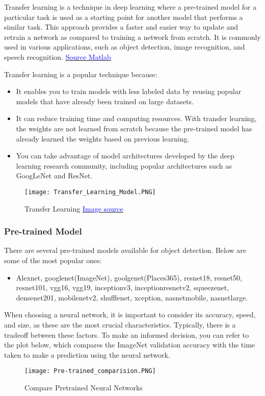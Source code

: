 Transfer learning is a technique in deep learning where a pre-trained model for a particular task is used as a starting point for another model that performs a similar task. This approach provides a faster and easier way to update and retrain a network as compared to training a network from scratch. It is commonly used in various applications, such as object detection, image recognition, and speech recognition. \cite{you2021logme}
\href{https://www.mathworks.com/discovery/transfer-learning.html?s_tid=srchtitle_support_results_1_Transfer%2520Learning}{\textcolor{blue}{Source Matlab}}

Transfer learning is a popular technique because:
\begin{itemize}
    \item It enables you to train models with less labeled data by reusing popular models that have already been trained on large datasets.
    \item  It can reduce training time and computing resources. With transfer learning, the weights are not learned from scratch because the pre-trained model has already learned the weights based on previous learning.
    \item You can take advantage of model architectures developed by the deep learning research community, including popular architectures such as GoogLeNet and ResNet.
\end{itemize}
\begin{figure}[H]
    \centering\texttt{[image: Transfer\_Learning\_Model.PNG]}
    \caption{Transfer Learning \protect\href{https://www.mathworks.com/help/deeplearning/ug/pretrained-convolutional-neural-networks.html}{\textcolor{blue}{Image source}}}
    \label{fig:Transfer Learning}
\end{figure}
\subsubsection{Pre-trained Model}
There are several pre-trained models available for object detection. Below are some of the most popular ones:\\
\begin{itemize}
    \item Alexnet, googlenet(ImageNet), goolgenet(Places365), resnet18, resnet50, resnet101, vgg16, vgg19, inceptionv3, inceptionresnetv2, squeezenet, densenet201, mobilenetv2, shufflenet, xception, nasnetmobile, nasnetlarge. 
\end{itemize}

When choosing a neural network, it is important to consider its accuracy, speed, and size, as these are the most crucial characteristics. Typically, there is a tradeoff between these factors. To make an informed decision, you can refer to the plot below, which compares the ImageNet validation accuracy with the time taken to make a prediction using the neural network. \cite{li2019analysis}
\begin{figure}[H]
    \centering
    \texttt{[image: Pre-trained\_comparision.PNG]}
    \caption{Compare Pretrained Neural Networks}
    \label{fig: Pretrained Model Comparison}
\end{figure}

